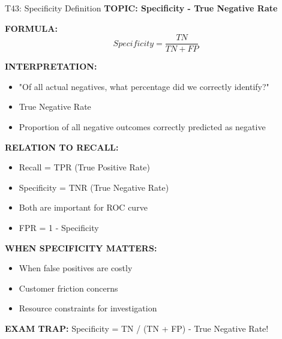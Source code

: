 \documentclass[8pt]{beamer}
\begin{document}
	\begin{frame}{T43: Specificity Definition}
		\fontsize{6.5}{7.5}\selectfont
		\textbf{TOPIC: Specificity - True Negative Rate}
		
		\vspace{0.1cm}
		\textbf{FORMULA:}
		\[
		Specificity = \frac{TN}{TN + FP}
		\]
		
		\vspace{0.1cm}
		\textbf{INTERPRETATION:}
		\begin{itemize}
			\item "Of all actual negatives, what percentage did we correctly identify?"
			\item True Negative Rate
			\item Proportion of all negative outcomes correctly predicted as negative
		\end{itemize}
		
		\vspace{0.1cm}
		\textbf{RELATION TO RECALL:}
		\begin{itemize}
			\item Recall = TPR (True Positive Rate)
			\item Specificity = TNR (True Negative Rate)
			\item Both are important for ROC curve
			\item FPR = 1 - Specificity
		\end{itemize}
		
		\vspace{0.1cm}
		\textbf{WHEN SPECIFICITY MATTERS:}
		\begin{itemize}
			\item When false positives are costly
			\item Customer friction concerns
			\item Resource constraints for investigation
		\end{itemize}
		
		\textcolor{myred}{\textbf{EXAM TRAP:}} Specificity = \textcolor{myblue}{TN / (TN + FP)} - True Negative Rate!
	\end{frame}
	
\end{document}
